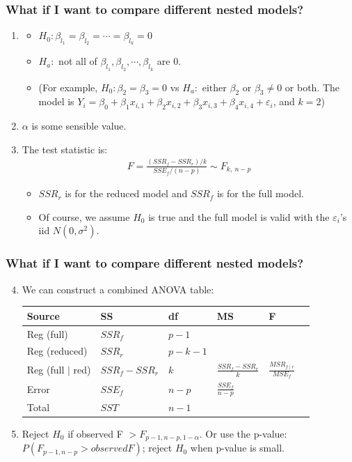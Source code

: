 \documentclass[handout]{beamer}\usepackage[]{graphicx}\usepackage[]{color}
\providecommand{\e}{\varepsilon}
\numberwithin{equation}{section}
\begin{document}
\begin{frame}
\frametitle{What if I want to compare different nested models?}
\begin{enumerate}[1. ]
\item 
\begin{itemize}
\item $H_0: \beta_{l_1}= \beta_{l_2}  = \cdots = \beta_{l_k} = 0$
\pause \item $H_a:$ not all of $\beta_{l_1}, \beta_{l_2}, \cdots, \beta_{l_k}$ are 0.
\pause \item 
(For example, $H_0: \beta_2 = \beta_3 = 0$ vs $H_a: \text{ either } \beta_2 \text{ or } \beta_3 \ne 0$ or both. The model is $Y_i = \beta_0 + \beta_1 x_{i,1} + \beta_2 x_{i,2} +  \beta_3 x_{i,3} +  \beta_4 x_{i,4} + \e_i$, and $k = 2$)

\end{itemize}
\pause \item $\alpha$ is some sensible value.
\pause \item The test statistic is:
\pause \begin{align*}
F = \frac{(SSR_f - SSR_r)/k}{SSE_f/(n-p)} \sim F_{k, \ n-p}
\end{align*}
\begin{itemize}
\pause \item $SSR_r$ is for the reduced model and $SSR_f$ is for the full model.
\pause \item Of course, we assume $H_0$ is true and the full model is valid with the $\e_i$'s iid $N(0, \sigma^2)$.
\end{itemize}
\end{enumerate}
\end{frame}


\begin{frame}
\frametitle{What if I want to compare different nested models?} \scriptsize
\begin{enumerate} 
\setcounter{enumi}{3}
\item We can construct a combined ANOVA table:
\begin{center}
\begin{tabular}{llllll}
Source & SS & df & MS & F & \\ \hline
Reg (full) & $SSR_f$ & $p-1$ &  & &  \\ 
Reg (reduced) & $SSR_r$ & $p-k-1$&  & &  \\ 
Reg (full $\mid$ red) & $SSR_f - SSR_r$ & $k$ & $\frac{SSR_f - SSR_r}{k}$ & $\frac{MSR_{f \mid r}}{MSE_f}$ &  \\ 
Error & $SSE_f$ & $n-p$ & $\frac{SSE_f}{n-p}$& & \\ \hline
Total & $SST$ & $n-1$ & & & 
\end{tabular}
\end{center}
\item 
Reject $H_0$ if observed F $> F_{p-1, n - p, 1 - \alpha}$. Or use the p-value: $P(F_{p-1, n-p} > observed F)$; reject $H_0$ when p-value is small.
\end{enumerate}
\end{frame}
\end{document}
